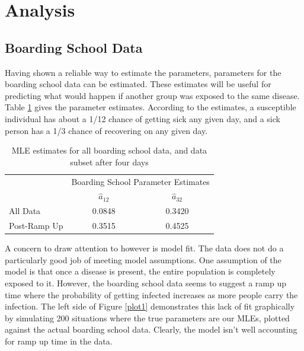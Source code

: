 \documentclass{svproc}
\begin{document}
\section{Analysis}
\subsection*{Boarding School Data}
Having shown a reliable way to estimate the parameters, parameters for the boarding school data can be estimated. These estimates will be useful for predicting what would happen if another group was exposed to the same disease. Table \ref{tab2} gives the parameter estimates. According to the estimates, a susceptible individual has about a 1/12 chance of getting sick any given day, and a sick person has a 1/3 chance of recovering on any given day.
\begin{table}
\centering
\setlength{\tabcolsep}{30pt}
\begin{tabular}{l|c|c|}
\cline{2-3}
&\multicolumn{2}{|c|}{Boarding School Parameter Estimates} \\
\cline{2-3}
&$\hat{a}_{12}$ & $\hat{a}_{32}$ \\ \hline
All Data&0.0848 & 0.3420 \\ \hline
Post-Ramp Up&0.3515 & 0.4525 \\ \hline
\end{tabular}
\caption{MLE estimates for all boarding school data, and data subset after four days}
\label{tab2}
\end{table}

A concern to draw attention to however is model fit. The data does not do a particularly good job of meeting model assumptions. One assumption of the model is that once a disease is present, the entire population is completely exposed to it. However, the boarding school data seems to suggest a ramp up time where the probability of getting infected increases as more people carry the infection. The left side of Figure \ref{plot1} demonstrates this lack of fit graphically by simulating 200 situations where the true parameters are our MLEs, plotted against the actual boarding school data. Clearly, the model isn't well accounting for ramp up time in the data.
\end{document}
